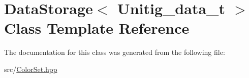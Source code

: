 \hypertarget{classDataStorage}{}\section{Data\+Storage$<$ Unitig\+\_\+data\+\_\+t $>$ Class Template Reference}
\label{classDataStorage}


The documentation for this class was generated from the following file\+:\begin{DoxyCompactItemize}
\item 
src/\hyperlink{ColorSet_8hpp}{Color\+Set.\+hpp}\end{DoxyCompactItemize}
